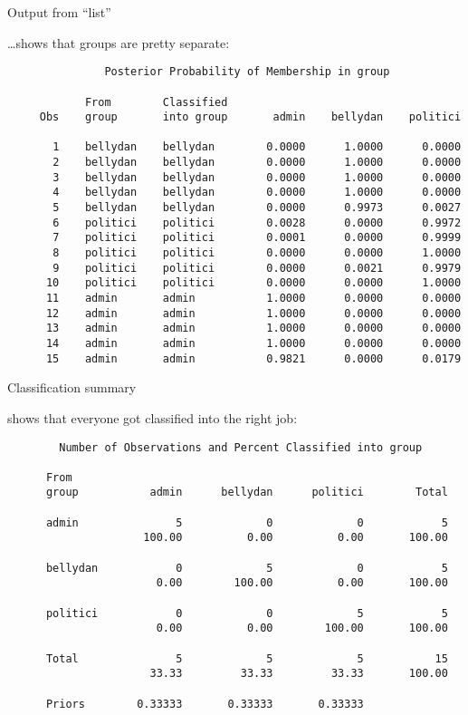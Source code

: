 \documentclass[pdf]{prosper}
\begin{document}
\begin{slide}{Output from ``list''}

\ldots shows that groups are pretty separate:

{\scriptsize
\begin{verbatim}
               Posterior Probability of Membership in group
 
            From        Classified
     Obs    group       into group       admin    bellydan    politici

       1    bellydan    bellydan        0.0000      1.0000      0.0000
       2    bellydan    bellydan        0.0000      1.0000      0.0000
       3    bellydan    bellydan        0.0000      1.0000      0.0000
       4    bellydan    bellydan        0.0000      1.0000      0.0000
       5    bellydan    bellydan        0.0000      0.9973      0.0027
       6    politici    politici        0.0028      0.0000      0.9972
       7    politici    politici        0.0001      0.0000      0.9999
       8    politici    politici        0.0000      0.0000      1.0000
       9    politici    politici        0.0000      0.0021      0.9979
      10    politici    politici        0.0000      0.0000      1.0000
      11    admin       admin           1.0000      0.0000      0.0000
      12    admin       admin           1.0000      0.0000      0.0000
      13    admin       admin           1.0000      0.0000      0.0000
      14    admin       admin           1.0000      0.0000      0.0000
      15    admin       admin           0.9821      0.0000      0.0179

\end{verbatim}
}
  
\end{slide}

\begin{slide}{Classification summary}

shows that everyone got classified into the right job:

{\scriptsize
\begin{verbatim}
        Number of Observations and Percent Classified into group
 
      From
      group           admin      bellydan      politici        Total

      admin               5             0             0            5
                     100.00          0.00          0.00       100.00

      bellydan            0             5             0            5
                       0.00        100.00          0.00       100.00

      politici            0             0             5            5
                       0.00          0.00        100.00       100.00

      Total               5             5             5           15
                      33.33         33.33         33.33       100.00

      Priors        0.33333       0.33333       0.33333             
 
\end{verbatim}
}
  
\end{slide}
\end{document}
